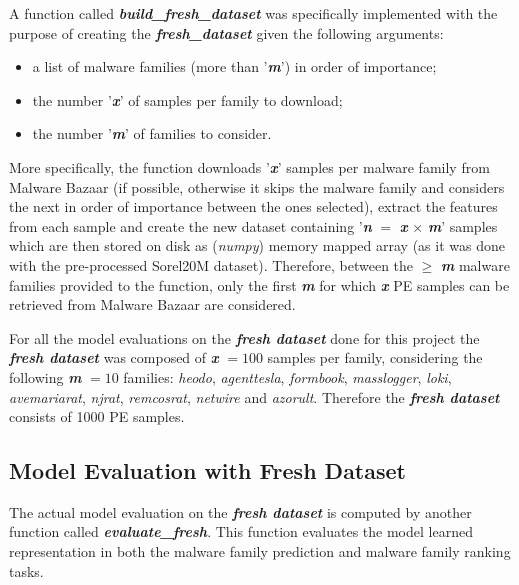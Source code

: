 \documentclass[pdfa%
,cucitura%
]{toptesi}
\begin{document}
A function called \textit{\textbf{build\_fresh\_dataset}} was specifically implemented with the purpose of creating the \textit{\textbf{fresh\_dataset}} given the following arguments:
\begin{itemize}
	\item a list of malware families (more than '\textit{\textbf{m}}') in order of importance;
	
	\item the number '\textit{\textbf{x}}' of samples per family to download;
	
	\item the number '\textit{\textbf{m}}' of families to consider.
\end{itemize}
More specifically, the function downloads '\textit{\textbf{x}}' samples per malware family from Malware Bazaar (if possible, otherwise it skips the malware family and considers the next in order of importance between the ones selected), extract the features from each sample and create the new dataset containing '\textit{\textbf{n}} $=$ \textit{\textbf{x}} $\times$ \textit{\textbf{m}}' samples which are then stored on disk as (\textit{numpy}) memory mapped array (as it was done with the pre-processed Sorel20M dataset). Therefore, between the $\ge$ \textit{\textbf{m}} malware families provided to the function, only the first \textit{\textbf{m}} for which \textit{\textbf{x}} PE samples can be retrieved from Malware Bazaar are considered.

For all the model evaluations on the \textit{\textbf{fresh dataset}} done for this project the \textit{\textbf{fresh dataset}} was composed of \textit{\textbf{x}} $= 100$ samples per family, considering the following \textit{\textbf{m}} $= 10$ families: \textit{heodo}, \textit{agenttesla}, \textit{formbook}, \textit{masslogger}, \textit{loki}, \textit{avemariarat}, \textit{njrat}, \textit{remcosrat}, \textit{netwire} and \textit{azorult}. Therefore the \textit{\textbf{fresh dataset}} consists of 1000 PE samples.

\subsection{Model Evaluation with Fresh Dataset}
The actual model evaluation on the \textit{\textbf{fresh dataset}} is computed by another function called \textit{\textbf{evaluate\_fresh}}. This function evaluates the model learned representation in both the malware family prediction and malware family ranking tasks.
\end{document}
